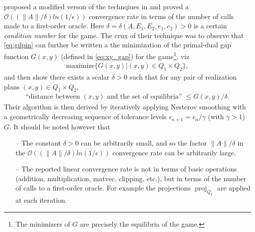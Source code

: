 \documentclass{article} %
\DeclareMathOperator{\proj}{proj}
\begin{document}
\cite{gilpinfirst} proposed a modified verson of the technqiues in
\cite{hoda2010smoothing} and  proved a $\mathcal{O}\left(\left(\|A\| /
\delta\right) ln\left(1 / \epsilon\right)\right)$ convergence rate in
terms of the number of calls made to a first-order oracle. Here
$\delta = \delta(A, E_1, E_2, e_1, e_2) > 0$ is a certain
\textit{condition number} for the game. The crux of their technique was to
observe that \eqref{eq:gilpin} can further be written a the minimization of
the primal-dual gap function $G(x, y)$ (defined in \eqref{eq:xy_gap})
for the game\footnote{The minimizers of $G$ are precisely the
  equilibria of the game.}, viz
\begin{eqnarray}
\mathrm{maximize}\{G(x,y)|(x,y) \in Q_1 \times Q_2\},
\end{eqnarray}
and then show there exists a scalar
$\delta > 0$ such that for any pair of realization plans $(x, y) \in Q_1 \times Q_2$,
\begin{eqnarray}
\text{``distance between }(x, y)\text{ and the set of
equilibria'' } \le G(x, y)/\delta.
\end{eqnarray}
Their
algorithm is then derived by iteratively applying Nesterov smoothing \cite{nesterov2005a}
with a geometrically decreasing sequence of tolerance levels
$\epsilon_{n+1} = \epsilon_n / \gamma$ (with $\gamma > 1$)  $G$. It
should be noted however that
\begin{itemize}
\item[--] The constant $\delta > 0$ can be arbitrarily small, and so
  the factor $\|A\| / \delta$ in the $\mathcal{O}\left(\left(\|A\| /
\delta\right) ln\left(1 / \epsilon\right)\right)$ convergence rate can
be arbitrarily large.
\item[--] The reported linear convergence rate is not in terms of
  basic operations (addition, multiplication, matvec, clipping, etc.),
  but in terms of the number of calls to a first-order oracle. For
  example the projections $\proj_{Q_k}$ are applied at each iteration.%

\end{itemize}

\end{document}
